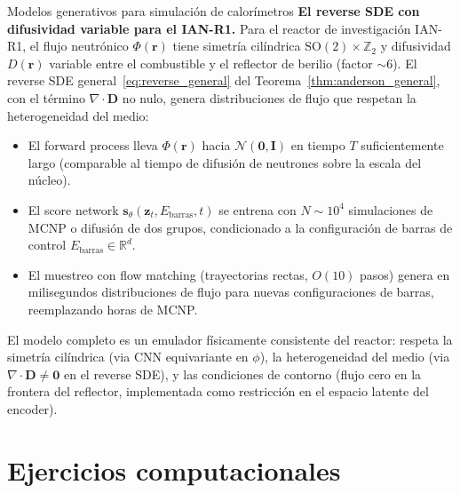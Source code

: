 \begin{estrella}{Modelos generativos para simulación de calorímetros}
\textbf{El reverse SDE con difusividad variable para el IAN-R1.}
Para el reactor de investigación IAN-R1, el flujo neutrónico $\Phi(\bm{r})$
tiene simetría cilíndrica $\mathrm{SO}(2)\times\mathbb{Z}_2$ y difusividad
$D(\bm{r})$ variable entre el combustible y el reflector de berilio (factor
$\sim 6$). El reverse SDE general~\eqref{eq:reverse_general} del
Teorema~\ref{thm:anderson_general}, con el término $\nabla\cdot\bm{D}$ no nulo,
genera distribuciones de flujo que respetan la heterogeneidad del medio:
\begin{itemize}
  \item El forward process lleva $\Phi(\bm{r})$ hacia $\mathcal{N}(\bm{0},\bm{I})$
        en tiempo $T$ suficientemente largo (comparable al tiempo de difusión
        de neutrones sobre la escala del núcleo).
  \item El score network $\bm{s}_\theta(\bm{z}_t, E_{\mathrm{barras}}, t)$ se
        entrena con $N\sim 10^4$ simulaciones de MCNP o difusión de dos grupos,
        condicionado a la configuración de barras de control
        $E_{\mathrm{barras}}\in\mathbb{R}^d$.
  \item El muestreo con flow matching (trayectorias rectas, $O(10)$ pasos)
        genera en milisegundos distribuciones de flujo para nuevas configuraciones
        de barras, reemplazando horas de MCNP.
\end{itemize}
El modelo completo es un emulador físicamente consistente del reactor:
respeta la simetría cilíndrica (via CNN equivariante en $\phi$), la
heterogeneidad del medio (via $\nabla\cdot\bm{D}\neq\bm{0}$ en el reverse SDE),
y las condiciones de contorno (flujo cero en la frontera del reflector,
implementada como restricción en el espacio latente del encoder).
\end{estrella}

\section*{Ejercicios computacionales}

